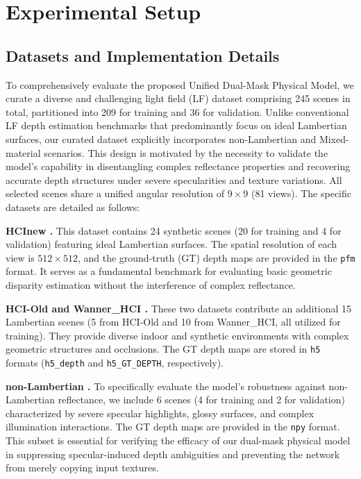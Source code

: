 \documentclass[lettersize,journal]{IEEEtran}
\begin{document}
\section{Experimental Setup}

\subsection{Datasets and Implementation Details}

To comprehensively evaluate the proposed Unified Dual-Mask Physical Model, we curate a diverse and challenging light field (LF) dataset comprising 245 scenes in total, partitioned into 209 for training and 36 for validation. Unlike conventional LF depth estimation benchmarks that predominantly focus on ideal Lambertian surfaces, our curated dataset explicitly incorporates non-Lambertian and Mixed-material scenarios. This design is motivated by the necessity to validate the model's capability in disentangling complex reflectance properties and recovering accurate depth structures under severe specularities and texture variations. All selected scenes share a unified angular resolution of $9 \times 9$ (81 views). The specific datasets are detailed as follows:

\textbf{HCInew .} This dataset contains 24 synthetic scenes (20 for training and 4 for validation) featuring ideal Lambertian surfaces. The spatial resolution of each view is $512 \times 512$, and the ground-truth (GT) depth maps are provided in the \texttt{pfm} format. It serves as a fundamental benchmark for evaluating basic geometric disparity estimation without the interference of complex reflectance.

\textbf{HCI-Old  and Wanner\_HCI .} These two datasets contribute an additional 15 Lambertian scenes (5 from HCI-Old and 10 from Wanner\_HCI, all utilized for training). They provide diverse indoor and synthetic environments with complex geometric structures and occlusions. The GT depth maps are stored in \texttt{h5} formats (\texttt{h5\_depth} and \texttt{h5\_GT\_DEPTH}, respectively).

\textbf{non-Lambertian .} To specifically evaluate the model's robustness against non-Lambertian reflectance, we include 6 scenes (4 for training and 2 for validation) characterized by severe specular highlights, glossy surfaces, and complex illumination interactions. The GT depth maps are provided in the \texttt{npy} format. This subset is essential for verifying the efficacy of our dual-mask physical model in suppressing specular-induced depth ambiguities and preventing the network from merely copying input textures.
\end{document}
